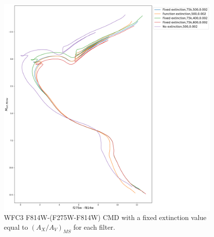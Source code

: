 \documentclass[12pt, a4paper]{report}
\begin{document}
\begin{figure}[h!]
\begin{center}
\includegraphics[width=1.0\textwidth]{../basti_isochrones_10_13Gyr/Extinction_T5k_FeH0fix_func_f814w_f275wmf814w_500_400_600_Myr_FeH_0p002_ref_noext_Av_1p0.pdf}
\caption{WFC3 F814W-(F275W-F814W) CMD with a fixed extinction value equal to $(A_{X}/A_{V})_{MS}$ for each filter.}
\label{wfc3_isoc2_T5k}
\end{center}
\end{figure}
\end{document}
